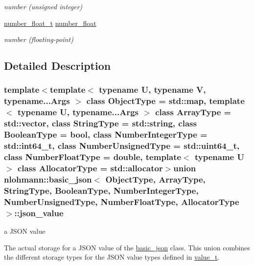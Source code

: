 \begin{DoxyCompactItemize}
\begin{DoxyCompactList}\small\item\em number (unsigned integer) \end{DoxyCompactList}\item 
\hyperlink{classnlohmann_1_1basic__json_a74a0013e847fdc574b48f931f0e757e1}{number\+\_\+float\+\_\+t} \hyperlink{unionnlohmann_1_1basic__json_1_1json__value_acdedc3de7fbc1ae912f5918730658ec0}{number\+\_\+float}
\begin{DoxyCompactList}\small\item\em number (floating-\/point) \end{DoxyCompactList}\end{DoxyCompactItemize}


\subsection{Detailed Description}
\subsubsection*{template$<$template$<$ typename U, typename V, typename...\+Args $>$ class Object\+Type = std\+::map, template$<$ typename U, typename...\+Args $>$ class Array\+Type = std\+::vector, class String\+Type = std\+::string, class Boolean\+Type = bool, class Number\+Integer\+Type = std\+::int64\+\_\+t, class Number\+Unsigned\+Type = std\+::uint64\+\_\+t, class Number\+Float\+Type = double, template$<$ typename U $>$ class Allocator\+Type = std\+::allocator$>$union nlohmann\+::basic\+\_\+json$<$ Object\+Type, Array\+Type, String\+Type, Boolean\+Type, Number\+Integer\+Type, Number\+Unsigned\+Type, Number\+Float\+Type, Allocator\+Type $>$\+::json\+\_\+value}

a J\+S\+O\+N value 

The actual storage for a J\+S\+O\+N value of the \hyperlink{classnlohmann_1_1basic__json}{basic\+\_\+json} class. This union combines the different storage types for the J\+S\+O\+N value types defined in \hyperlink{classnlohmann_1_1basic__json_a231b02148577b69a154b2ce2c87a5522}{value\+\_\+t}.

